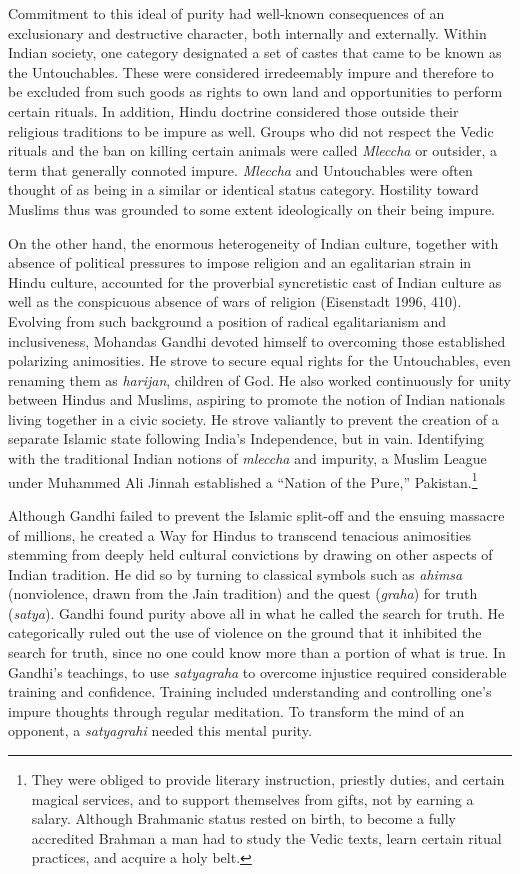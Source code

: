 Commitment to this ideal of purity had well-known consequences of an exclusionary and destructive character, both internally and externally. Within Indian society, one category designated a set of castes that came to be known as the Untouchables. These were considered irredeemably impure and therefore to be excluded from such goods as rights to own land and opportunities to perform certain rituals. In addition, Hindu doctrine considered those outside their religious traditions to be impure as well. Groups who did not respect the Vedic rituals and the ban on killing certain animals were called \emph{Mleccha} or outsider, a term that generally connoted impure. \emph{Mleccha} and Untouchables were often thought of as being in a similar or identical status category. Hostility toward Muslims thus was grounded to some extent ideologically on their being impure.

On the other hand, the enormous heterogeneity of Indian culture, together with absence of political pressures to impose religion and an egalitarian strain in Hindu culture, accounted for the proverbial syncretistic cast of Indian culture as well as the conspicuous absence of wars of religion (Eisenstadt 1996, 410). Evolving from such background a position of radical egalitarianism and inclusiveness, Mohandas Gandhi devoted himself to overcoming those established polarizing animosities. He strove to secure equal rights for the Untouchables, even renaming them as \emph{harijan}, children of God. He also worked continuously for unity between Hindus and Muslims, aspiring to promote the notion of Indian nationals living together in a civic society. He strove valiantly to prevent the creation of a separate Islamic state following India's Independence, but in vain. Identifying with the traditional Indian notions of \emph{mleccha} and impurity, a Muslim League under Muhammed Ali Jinnah established a ``Nation of the Pure,'' Pakistan.\footnote{They were obliged to provide literary instruction, priestly duties, and certain magical services, and to support themselves from gifts, not by earning a salary. Although Brahmanic status rested on birth, to become a fully accredited Brahman a man had to study the Vedic texts, learn certain ritual practices, and acquire a holy belt.}

Although Gandhi failed to prevent the Islamic split-off and the ensuing massacre of millions, he created a Way for Hindus to transcend tenacious animosities stemming from deeply held cultural convictions by drawing on other aspects of Indian tradition. He did so by turning to classical symbols such as \emph{ahimsa} (nonviolence, drawn from the Jain tradition) and the quest (\emph{graha}) for truth (\emph{satya}). Gandhi found purity above all in what he called the search for truth. He categorically ruled out the use of violence on the ground that it inhibited the search for truth, since no one could know more than a portion of what is true. In Gandhi's teachings, to use \emph{satyagraha} to overcome injustice required considerable training and confidence. Training included understanding and controlling one's impure thoughts through regular meditation. To transform the mind of an opponent, a \emph{satyagrahi} needed this mental purity.

